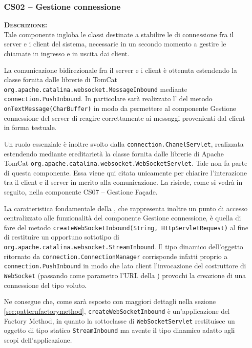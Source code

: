 \subsubsection{CS02 -- Gestione connessione}\label{sec:cs02}
\begin{description}
	\item{\scshape\bfseries Descrizione:}\\
Tale componente ingloba le classi destinate a stabilire le  di connessione fra il server e i client del sistema, necessarie in un secondo momento a gestire le chiamate in ingresso e in uscita dai client.

La comunicazione bidirezionale fra il server e i client è ottenuta estendendo la classe fornita dalle librerie di TomCat \texttt{org.apache.catalina.websocket.MessageInbound} mediante \texttt{connection.PushInbound}. In particolare sarà realizzato l' del metodo \texttt{onTextMessage(CharBuffer)} in modo da permettere al componente \textsf{Gestione connessione} del server di reagire correttamente ai messaggi provenienti dal client in forma testuale.

Un ruolo essenziale è inoltre svolto dalla  \texttt{connection.ChanelServlet}, realizzata estendendo mediante ereditarietà la classe fornita dalle librerie di Apache TomCat \texttt{org.apache.catalina.websocket.WebSocketServlet}. Tale  non fa parte di questa componente. Essa viene qui citata unicamente per chiarire l'interazione tra il client e il server in merito alla comunicazione. La  risiede, come si vedrà in seguito, nella componente \textsf{CS07 -- Gestione Façade}.

La caratteristica fondamentale della , che rappresenta inoltre un punto di accesso centralizzato alle funzionalità del componente \textsf{Gestione connessione}, è quella di fare  del metodo \texttt{createWebSocketInbound(String, HttpServletRequest)} al fine di restituire un opportuno sottotipo di \texttt{org.apache.catalina.websocket.StreamInbound}. Il tipo dinamico dell'oggetto ritornato da \texttt{connection.ConnectionManager} corrisponde infatti proprio a \texttt{connection.PushInbound} in modo che lato client l'invocazione del costruttore di \texttt{WebSocket} (passando come parametro l'URL della ) provochi la creazione di una connessione del tipo voluto.

Ne consegue che, come sarà esposto con maggiori dettagli nella sezione \vref{sec:patternfactorymethod}, \texttt{createWebSocketInbound} è un'applicazione del  Factory Method, in quanto la sottoclasse di \texttt{WebSocketServlet} restituisce un oggetto di tipo statico \texttt{StreamInbound} ma avente il tipo dinamico adatto agli scopi dell'applicazione.


\end{description}
